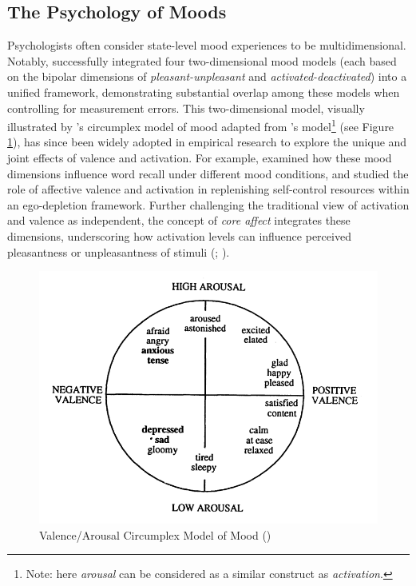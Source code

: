 \documentclass[../MA_Thesis.tex]{subfiles}
\begin{document}
\subsection*{The Psychology of Moods}
Psychologists often consider state-level mood experiences to be multidimensional. Notably, \textcite{yik_structure_1999} successfully integrated four two-dimensional mood models (each based on the bipolar dimensions of \textit{pleasant-unpleasant} and \textit{activated-deactivated}) into a unified framework, demonstrating substantial overlap among these models when controlling for measurement errors. This two-dimensional model, visually illustrated by \textcite{feldman_variations_1995}'s circumplex model of mood adapted from \textcite{russell_circumplex_1980}'s model\footnote{Note: here \textit{arousal} can be considered as a similar construct as \textit{activation}.} (see Figure \ref{fig: mood circumplex}), has since been widely adopted in empirical research to explore the unique and joint effects of valence and activation. For example, \textcite{balch_dimensions_1999} examined how these mood dimensions influence word recall under different mood conditions, and \textcite{nealis_positive_2016} studied the role of affective valence and activation in replenishing self-control resources within an ego-depletion framework. Further challenging the traditional view of activation and valence as independent, the concept of \textit{core affect} integrates these dimensions, underscoring how activation levels can influence perceived pleasantness or unpleasantness of stimuli (\cite{petrolini_core_2020}; \cite{russell_core_1999}).

\begin{figure}
    \centering
    \includegraphics[width=0.5\linewidth, keepaspectratio]{screenshots/A Circumplex Model of Mood.png}
    \caption{Valence/Arousal Circumplex Model of Mood (\cite{feldman_variations_1995})}
    \label{fig: mood circumplex}
\end{figure}
\end{document}
